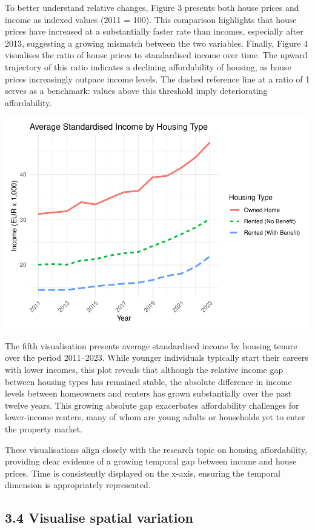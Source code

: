 \documentclass[
]{article}
\begin{document}
To better understand relative changes, Figure 3 presents both house
prices and income as indexed values (2011 = 100). This comparison
highlights that house prices have increased at a substantially faster
rate than incomes, especially after 2013, suggesting a growing mismatch
between the two variables. Finally, Figure 4 visualises the ratio of
house prices to standardised income over time. The upward trajectory of
this ratio indicates a declining affordability of housing, as house
prices increasingly outpace income levels. The dashed reference line at
a ratio of 1 serves as a benchmark: values above this threshold imply
deteriorating affordability.

\begin{center}\includegraphics[width=0.52\linewidth,height=0.3\textheight]{r.markdown-group-6_files/figure-latex/visualise temporal variation three-1} \end{center}

The fifth visualisation presents average standardised income by housing
tenure over the period 2011--2023. While younger individuals typically
start their careers with lower incomes, this plot reveals that although
the relative income gap between housing types has remained stable, the
absolute difference in income levels between homeowners and renters has
grown substantially over the past twelve years. This growing absolute
gap exacerbates affordability challenges for lower-income renters, many
of whom are young adults or households yet to enter the property market.

These visualisations align closely with the research topic on housing
affordability, providing clear evidence of a growing temporal gap
between income and house prices. Time is consistently displayed on the
x-axis, ensuring the temporal dimension is appropriately represented.

\subsection{3.4 Visualise spatial
variation}\label{visualise-spatial-variation}
\end{document}
